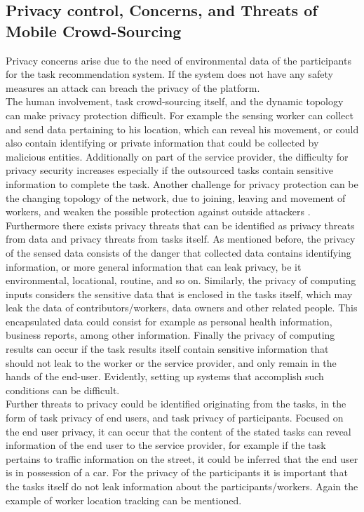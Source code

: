 \documentclass[a4paper,12pt]{report}
\begin{document}
		\subsection{Privacy control, Concerns, and Threats of Mobile Crowd-Sourcing} \label{PrivacyMCS}
		\startsubsection
			Privacy concerns arise due to the need of environmental data of the participants for the task recommendation system. If the system does not have any safety measures an attack can breach the privacy of the platform. \\
			The human involvement, task crowd-sourcing itself, and the dynamic topology can make privacy protection difficult.
			For example the sensing worker can collect and send data pertaining to his location, which can reveal his movement, or could also contain identifying or private information that could be collected by malicious entities. Additionally on part of the service provider, the difficulty for privacy security increases especially if the outsourced tasks contain sensitive information to complete the task. Another challenge for privacy protection can be the changing topology of the network, due to joining, leaving and movement of workers, and weaken the possible protection against outside attackers \cite{SecPriMobCSM}.\\
			Furthermore there exists privacy threats that can be identified as privacy threats from data and privacy threats from tasks itself. As mentioned before, the privacy of the sensed data consists of the danger that collected data contains identifying information, or more general information that can leak privacy, be it environmental, locational, routine, and so on. Similarly, the privacy of computing inputs considers the sensitive data that is enclosed in the tasks itself, which may leak the data of contributors/workers, data owners and other related people. This encapsulated data could consist for example as personal health information, business reports, among other information. Finally the privacy of computing results can occur if the task results itself contain sensitive information that should not leak to the worker or the service provider, and only remain in the hands of the end-user. Evidently, setting up systems that accomplish such conditions can be difficult.\\
			Further threats to privacy could be identified originating from the tasks, in the form of task privacy of end users, and task privacy of participants. Focused on the end user privacy, it can occur that the content of the stated tasks can reveal information of the end user to the service provider, for example if the task pertains to traffic information on the street, it could be inferred that the end user is in possession of a car. For the privacy of the participants it is important that the tasks itself do not leak information about the participants/workers. Again the example of worker location tracking can be mentioned.\\
\end{document}
